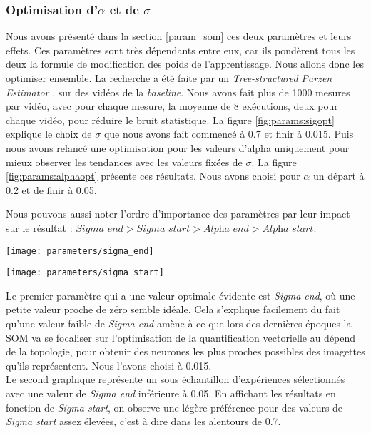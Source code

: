 	\subsubsection{Optimisation d'$\alpha$ et de $\sigma$}

	Nous avons présenté dans la section \ref{param_som} ces deux paramètres et leurs effets. Ces paramètres sont très dépendants entre eux, car ils pondèrent tous les deux la formule de modification des poids de l'apprentissage. Nous allons donc les optimiser ensemble. La recherche a été faite par un \textit{Tree-structured Parzen Estimator} \cite{bergstra2011algorithms}, sur des vidéos de la \textit{baseline}. Nous avons fait plus de 1000 mesures par vidéo, avec pour chaque mesure, la moyenne de 8 exécutions, deux pour chaque vidéo, pour réduire le bruit statistique. La figure \ref{fig:params:sigopt} explique le choix de $\sigma$ que nous avons fait commencé à 0.7 et finir à 0.015. Puis nous avons relancé une optimisation pour les valeurs d'alpha uniquement pour mieux observer les tendances avec les valeurs fixées de $\sigma$. La figure \ref{fig:params:alphaopt} présente ces résultats. Nous avons choisi pour $\alpha$ un départ à 0.2 et de finir à 0.05.

	Nous pouvons aussi noter l'ordre d'importance des paramètres par leur impact sur le résultat : $\textit{Sigma end} > \textit{Sigma start} > \textit{Alpha end} > \textit{Alpha start}$.

	\begin{figureth}
		\begin{subfigureth}{.75\textwidth}
			\texttt{[image: parameters/sigma\_end]}	
		\end{subfigureth}
		\begin{subfigureth}{.75\textwidth}
			\texttt{[image: parameters/sigma\_start]}	
		\end{subfigureth}
		\caption[Optimisation de $\sigma$]{Le premier paramètre qui a une valeur optimale évidente est \textit{Sigma end}, où une petite valeur proche de zéro semble idéale. Cela s'explique facilement du fait qu'une valeur faible de \textit{Sigma end} amène à ce que lors des dernières époques la SOM va se focaliser sur l'optimisation de la quantification vectorielle au dépend de la topologie, pour obtenir des neurones les plus proches possibles des imagettes qu'ils représentent. Nous l'avons choisi à 0.015.\\
		
		Le second graphique représente un sous échantillon d'expériences sélectionnés avec une valeur de \textit{Sigma end} inférieure à 0.05. En affichant les résultats en fonction de \textit{Sigma start}, on observe une légère préférence pour des valeurs de \textit{Sigma start} assez élevées, c'est à dire dans les alentours de 0.7.}\label{fig:params:sigopt}
	\end{figureth}


